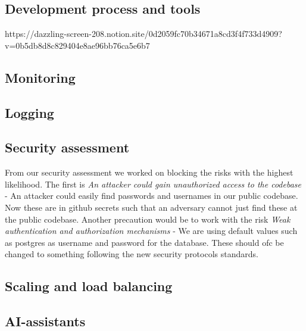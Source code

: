 \subsection{Development process and tools}
https://dazzling-screen-208.notion.site/0d2059fc70b34671a8cd3f4f733d4909?v=0b5db8d8c829404e8ae96bb76ca5e6b7

\subsection{Monitoring}

\subsection{Logging}

\subsection{Security assessment}
From our security assessment we worked on blocking the risks with the highest likelihood. The first is \textit{An attacker could gain unauthorized access to the codebase}
- An attacker could easily find passwords and usernames in our public codebase. Now these are in github secrets such that an adversary cannot just 
find these at the public codebase. Another precaution would be to work with the risk \textit{Weak authentication and authorization mechanisms}
 - We are using default values such as postgres as username and password for the database. These should ofc be changed to something following the
 new security protocols standards. 

 \subsection{Scaling and load balancing}

 \subsection{AI-assistants}